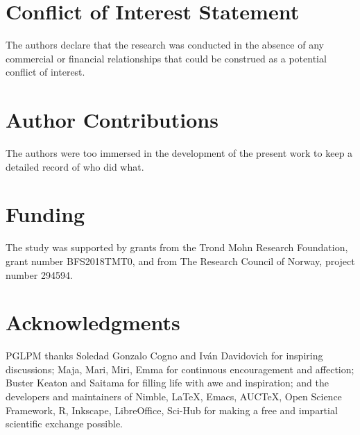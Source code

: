 \documentclass[utf8]{FrontiersinHarvard} %
\providecommand{\href}[2]{#2}
\renewcommand*{\|}[1][]{\nonscript\:#1\vert\nonscript\:\mathopen{}}
\begin{document}
\section*{Conflict of Interest Statement}

The authors declare that the research was conducted in the absence of any commercial or financial relationships that could be construed as a potential conflict of interest.

\section*{Author Contributions}

The authors were too immersed in the development of the present work to keep a detailed record of who did what.


\section*{Funding}
The study was supported by grants from the Trond Mohn Research Foundation, grant number BFS2018TMT0, and from The Research Council of Norway, project number 294594.

\section*{Acknowledgments}
PGLPM thanks Soledad Gonzalo Cogno and Iv\'an Davidovich for inspiring discussions;
Maja, Mari, Miri, Emma for continuous encouragement and affection; Buster Keaton and Saitama for filling life with awe and inspiration; and the developers and maintainers of Nimble, \LaTeX, Emacs, AUC\TeX, Open Science Framework, R, Inkscape, LibreOffice, Sci-Hub for making a free and impartial scientific exchange possible.
\end{document}
